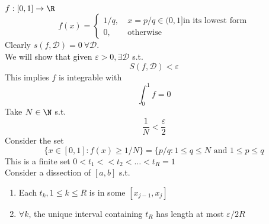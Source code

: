 \begin{example}
$f:[0,1] \to \R$
\[f(x) = \begin{cases} 1/q, \ &x = p/q\in(0,1]\text{in its lowest form}\\0, \ &\text{otherwise}\end{cases}\]
Clearly $s(f,\mathcal{D}) = 0 \ \forall \mathcal{D}$.\\
We will show that given $\varepsilon > 0, \exists \mathcal{D}$ s.t.
\[S(f,\mathcal{D}) < \varepsilon\]
This implies $f$ is integrable with
\[\int_0^1f = 0\]
Take $N\in \N$ s.t.
\[\frac{1}{N}<\frac{\varepsilon}{2}\]
Consider the set
\[\{x\in [0,1]: f(x)\geq 1/N\} = \{p/q: 1\leq q \leq N\text{ and }1\leq p \leq q\]
This is a finite set $0<t_1<<t_2<\dots<t_R=1$\\
Consider a dissection of $[a,b]$ s.t.
\begin{enumerate}
    \item Each $t_k, 1\leq k\leq R$ is in some $[x_{j-1},x_j]$
    \item $\forall k$, the unique interval containing $t_R$ has length at most $\varepsilon/2R$
\end{enumerate}
\begin{center}
    



\begin{tikzpicture}[x=0.75pt,y=0.75pt,yscale=-1,xscale=1]


\end{tikzpicture}
\end{center}
\end{example}
